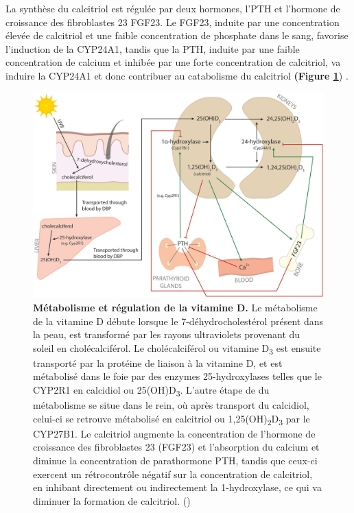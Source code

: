\documentclass[
  a4paper,
  DIV=11,
  numbers=noendperiod,
  listof=totoc]{scrreprt}
\begin{document}
La synthèse du calcitriol est régulée par deux hormones, l'\ac{PTH} et
l'hormone de croissance des fibroblastes 23 \acs{FGF23}. Le \ac{FGF23},
induite par une concentration élevée de calcitriol et une faible
concentration de phosphate dans le sang, favorise l'induction de la
\ac{CYP24A1}, tandis que la \ac{PTH}, induite par une faible
concentration de calcium et inhibée par une forte concentration de
calcitriol, va induire la \ac{CYP24A1} et donc contribuer au catabolisme
du calcitriol \textbf{(Figure \ref{fig:reg-vitd}})
\autocite{Dankers.2017,Christakos.2010}.

\begin{figure}
\includegraphics{figures/vitamin-d-metabolism-regulation.jpg} 
\caption[\textbf{Métabolisme et régulation de la vitamine D.}]
{\textbf{Métabolisme et régulation de la vitamine D.} Le métabolisme de la vitamine D débute lorsque le 7-déhydrocholestérol présent dans la peau, est transformé par les rayons ultraviolets provenant du soleil en cholécalciférol. Le cholécalciférol ou vitamine D\textsubscript{3} est ensuite transporté par la protéine de liaison à la vitamine D, et est métabolisé dans le foie par des enzymes 25-hydroxylases telles que le CYP2R1 en calcidiol ou 25(OH)D\textsubscript{3}. L'autre étape de du métabolisme se situe dans le rein, où après transport du calcidiol, celui-ci se retrouve métabolisé en calcitriol ou 1,25(OH)\textsubscript{2}D\textsubscript{3} par le CYP27B1. Le calcitriol augmente la concentration de l'hormone de croissance des fibroblastes 23 (FGF23) et l'absorption du calcium et diminue la concentration de parathormone \ac{PTH}, tandis que ceux-ci exercent un rétrocontrôle négatif sur la concentration de calcitriol, en inhibant directement ou indirectement la 1-hydroxylase, ce qui va diminuer la formation de calcitriol. (\cite{Dankers.2017})}
\label{fig:reg-vitd}
\end{figure}
\end{document}
